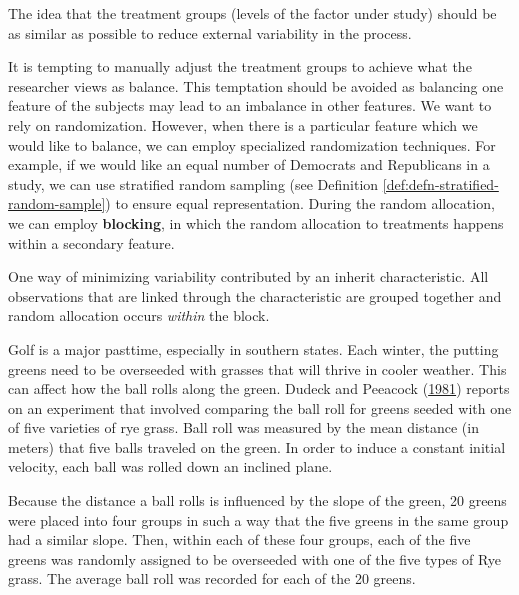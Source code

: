 \documentclass[]{book}
\theoremstyle{plain}
\theoremstyle{mydefn}
\theoremstyle{myexmpl}
\theoremstyle{remark}
\let\BeginKnitrBlock\begin \let\EndKnitrBlock\end
\let\BeginKnitrBlock\begin \let\EndKnitrBlock\end
\begin{document}
\BeginKnitrBlock{definition}[Comparative Groups]
\protect\hypertarget{def:defn-comparative-groups}{}{\label{def:defn-comparative-groups}
{} }The idea that the treatment groups
(levels of the factor under study) should be as similar as possible to
reduce external variability in the process.
\EndKnitrBlock{definition}

It is tempting to manually adjust the treatment groups to achieve what
the researcher views as balance. This temptation should be avoided as
balancing one feature of the subjects may lead to an imbalance in other
features. We want to rely on randomization. However, when there is a
particular feature which we would like to balance, we can employ
specialized randomization techniques. For example, if we would like an
equal number of Democrats and Republicans in a study, we can use
stratified random sampling (see Definition
\ref{def:defn-stratified-random-sample}) to ensure equal representation.
During the random allocation, we can employ \textbf{blocking}, in which
the random allocation to treatments happens within a secondary feature.

\BeginKnitrBlock{definition}[Blocking]
\protect\hypertarget{def:defn-blocking}{}{\label{def:defn-blocking}
{} }One way of minimizing variability contributed
by an inherit characteristic. All observations that are linked through
the characteristic are grouped together and random allocation occurs
\emph{within} the block.
\EndKnitrBlock{definition}

\BeginKnitrBlock{example}[Overseeding Golf Greens]
\protect\hypertarget{exm:anovadata-golf}{}{\label{exm:anovadata-golf}
{} }Golf is a major pasttime,
especially in southern states. Each winter, the putting greens need to
be overseeded with grasses that will thrive in cooler weather. This can
affect how the ball rolls along the green. Dudeck and Peeacock
(\protect\hyperlink{ref-Dudeck1981}{1981}) reports on an experiment that
involved comparing the ball roll for greens seeded with one of five
varieties of rye grass. Ball roll was measured by the mean distance (in
meters) that five balls traveled on the green. In order to induce a
constant initial velocity, each ball was rolled down an inclined plane.

Because the distance a ball rolls is influenced by the slope of the
green, 20 greens were placed into four groups in such a way that the
five greens in the same group had a similar slope. Then, within each of
these four groups, each of the five greens was randomly assigned to be
overseeded with one of the five types of Rye grass. The average ball
roll was recorded for each of the 20 greens.
\EndKnitrBlock{example}
\end{document}
